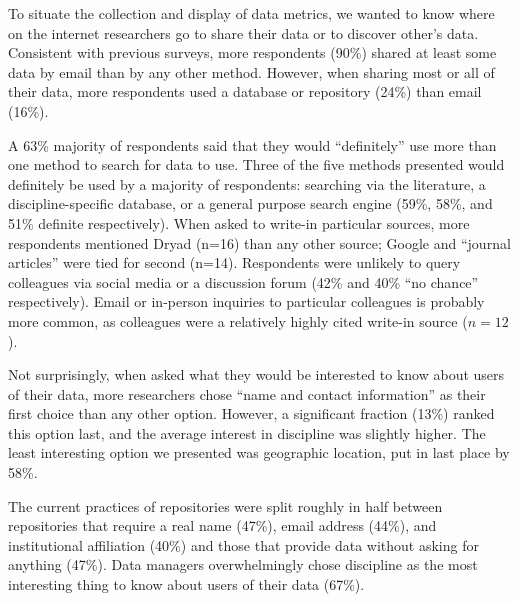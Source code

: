 \documentclass[english]{article}
\begin{document}

To situate the collection and display of data metrics, we wanted to know where on the internet researchers go to share their data or to discover other's data. 
Consistent with previous surveys\cite{@akers_disciplinary_2013, @wallis_if_2013, @kratz_researcher_2015}, more respondents (90\%) shared at least some data by email than by any other method. 
However, when sharing most or all of their data, more respondents used a database or repository (24\%) than email (16\%). 

A 63\% majority of respondents said that they would ``definitely'' use more than one method to search for data to use. 
Three of the five methods presented would definitely be used by a majority of respondents: searching via the literature, a discipline-specific database, or a general purpose search engine (59\%, 58\%, and 51\% definite respectively). 
When asked to write-in particular sources, more respondents mentioned Dryad (n=16) than any other source; Google and ``journal articles'' were tied for second (n=14). 
Respondents were unlikely to query colleagues via social media or a discussion forum (42\% and 40\% ``no chance'' respectively). 
Email or in-person inquiries to particular colleagues is probably more common, as colleagues were a relatively highly cited write-in source ($n=12$).


Not surprisingly, when asked what they would be interested to know about users of their data, more researchers chose ``name and contact information'' as their first choice than any other option.
However, a significant fraction (13\%) ranked this option last, and the average interest in discipline was slightly higher.
The least interesting option we presented was geographic location, put in last place by 58\%.

The current practices of repositories were split roughly in half between repositories that require a real name (47\%), email address (44\%), and institutional affiliation (40\%) and those that provide data without asking for anything (47\%).
Data managers overwhelmingly chose discipline as the most interesting thing to know about users of their data (67\%).
\end{document}
